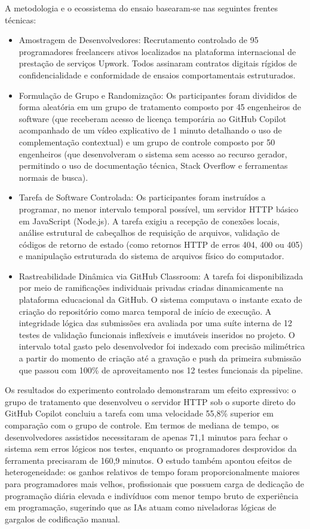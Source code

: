 A metodologia e o ecossistema do ensaio basearam-se nas seguintes frentes técnicas:
\begin{itemize}
    \item Amostragem de Desenvolvedores: Recrutamento controlado de 95 programadores freelancers ativos localizados na plataforma internacional de prestação de serviços Upwork. Todos assinaram contratos digitais rígidos de confidencialidade e conformidade de ensaios comportamentais estruturados.
    \item Formulação de Grupo e Randomização: Os participantes foram divididos de forma aleatória em um grupo de tratamento composto por 45 engenheiros de software (que receberam acesso de licença temporária ao GitHub Copilot acompanhado de um vídeo explicativo de 1 minuto detalhando o uso de complementação contextual) e um grupo de controle composto por 50 engenheiros (que desenvolveram o sistema sem acesso ao recurso gerador, permitindo o uso de documentação técnica, Stack Overflow e ferramentas normais de busca).
    \item Tarefa de Software Controlada: Os participantes foram instruídos a programar, no menor intervalo temporal possível, um servidor HTTP básico em JavaScript (Node.js). A tarefa exigiu a recepção de conexões locais, análise estrutural de cabeçalhos de requisição de arquivos, validação de códigos de retorno de estado (como retornos HTTP de erros 404, 400 ou 405) e manipulação estruturada do sistema de arquivos físico do computador.
    \item Rastreabilidade Dinâmica via GitHub Classroom: A tarefa foi disponibilizada por meio de ramificações individuais privadas criadas dinamicamente na plataforma educacional da GitHub. O sistema computava o instante exato de criação do repositório como marca temporal de início de execução. A integridade lógica das submissões era avaliada por uma suíte interna de 12 testes de validação funcionais inflexíveis e imutáveis inseridos no projeto. O intervalo total gasto pelo desenvolvedor foi indexado com precisão milimétrica a partir do momento de criação até a gravação e push da primeira submissão que passou com 100\% de aproveitamento nos 12 testes funcionais da pipeline.
\end{itemize}

Os resultados do experimento controlado demonstraram um efeito expressivo: o grupo de tratamento que desenvolveu o servidor HTTP sob o suporte direto do GitHub Copilot concluiu a tarefa com uma velocidade 55,8\% superior em comparação com o grupo de controle. Em termos de mediana de tempo, os desenvolvedores assistidos necessitaram de apenas 71,1 minutos para fechar o sistema sem erros lógicos nos testes, enquanto os programadores desprovidos da ferramenta precisaram de 160,9 minutos. O estudo também apontou efeitos de heterogeneidade: os ganhos relativos de tempo foram proporcionalmente maiores para programadores mais velhos, profissionais que possuem carga de dedicação de programação diária elevada e indivíduos com menor tempo bruto de experiência em programação, sugerindo que as IAs atuam como niveladoras lógicas de gargalos de codificação manual.



